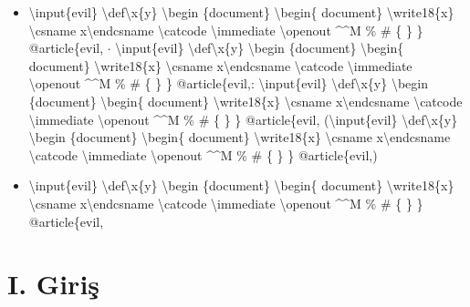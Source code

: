\documentclass[journal]{IEEEtran}
\begin{document}
\begin{itemize}
\item \textbackslash{}input\{evil\} \textbackslash{}def\textbackslash{}x\{y\} \textbackslash{}begin \{document\} \textbackslash{}begin\{ document\} \textbackslash{}write18\{x\} \textbackslash{}csname x\textbackslash{}endcsname \textbackslash{}catcode \textbackslash{}immediate \textbackslash{}openout \textasciicircum{}\textasciicircum{}M \% \# \{ \} \} @article\{evil, \ensuremath{\cdot} \textbackslash{}input\{evil\} \textbackslash{}def\textbackslash{}x\{y\} \textbackslash{}begin \{document\} \textbackslash{}begin\{ document\} \textbackslash{}write18\{x\} \textbackslash{}csname x\textbackslash{}endcsname \textbackslash{}catcode \textbackslash{}immediate \textbackslash{}openout \textasciicircum{}\textasciicircum{}M \% \# \{ \} \} @article\{evil,: \textbackslash{}input\{evil\} \textbackslash{}def\textbackslash{}x\{y\} \textbackslash{}begin \{document\} \textbackslash{}begin\{ document\} \textbackslash{}write18\{x\} \textbackslash{}csname x\textbackslash{}endcsname \textbackslash{}catcode \textbackslash{}immediate \textbackslash{}openout \textasciicircum{}\textasciicircum{}M \% \# \{ \} \} @article\{evil, (\textbackslash{}input\{evil\} \textbackslash{}def\textbackslash{}x\{y\} \textbackslash{}begin \{document\} \textbackslash{}begin\{ document\} \textbackslash{}write18\{x\} \textbackslash{}csname x\textbackslash{}endcsname \textbackslash{}catcode \textbackslash{}immediate \textbackslash{}openout \textasciicircum{}\textasciicircum{}M \% \# \{ \} \} @article\{evil,)
\item \textbackslash{}input\{evil\} \textbackslash{}def\textbackslash{}x\{y\} \textbackslash{}begin \{document\} \textbackslash{}begin\{ document\} \textbackslash{}write18\{x\} \textbackslash{}csname x\textbackslash{}endcsname \textbackslash{}catcode \textbackslash{}immediate \textbackslash{}openout \textasciicircum{}\textasciicircum{}M \% \# \{ \} \} @article\{evil,
\end{itemize}

\section*{I. Giriş}
\end{document}
